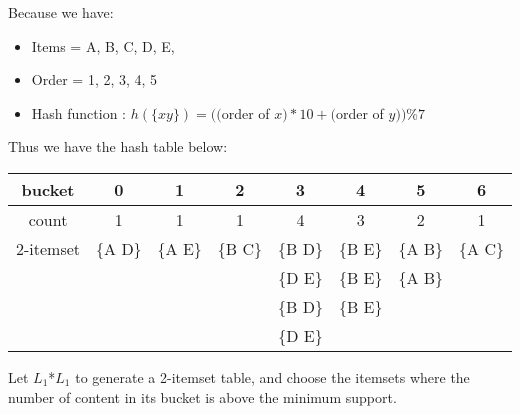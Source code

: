 \documentclass[en,black,normal,10pt]{elegantnote}
\begin{document}

Because we have:

\begin{itemize}
  \item Items = A, B, C, D, E,
  \item Order = 1, 2, 3, 4, 5
  \item Hash function : $h(\{x y\}) = (($order of $x)*10+($order of $y)) \% 7$
\end{itemize}

Thus we have the hash table below:

\begin{tabular}{|c|c|c|c|c|c|c|c|}
  \hline
    \rowcolor{Gray} %
    bucket & 0 & 1 & 2 & 3 & 4 & 5 & 6 \\
    \hline
    count & 1 & 1 & 1 & 4 & 3 & 2 & 1 \\
    \hline
    2-itemset & \{A D\} & \{A E\} & \{B C\} & \{B D\} & \{B E\} & \{A B\} & \{A C\} \\
    &  &  &  & \{D E\} & \{B E\} & \{A B\} & \\
    &  &  &  & \{B D\} & \{B E\} &  &  \\
    &  &  &  & \{D E\} &  &  &  \\
    \hline
\end{tabular}

\newpage

Let $L_1$*$L_1$ to generate a 2-itemset table, and choose the itemsets where the number of content in its bucket is above the minimum support.
\end{document}
